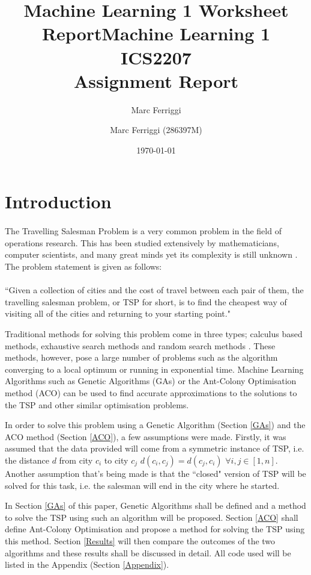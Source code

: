 \documentclass[11pt,a4paper,final]{article}
\author{Marc Ferriggi}
\title{Machine Learning 1 Worksheet Report}
\begin{document}
	\title{Machine Learning 1 \\
	\large ICS2207 \\ Assignment Report}
	\author{Marc Ferriggi (286397M)}
	\date{\today}
	\maketitle
	\tableofcontents
	
	\pagebreak
	\section{Introduction}
	\label{Intro}
	\paragraph{} The Travelling Salesman Problem is a very common problem in the field of operations research. This has been studied extensively by mathematicians, computer scientists, and many great minds yet its complexity is still unknown \cite{TSP}. The problem statement is given as follows:\\
	\hspace{0pt}\\
	``Given a collection of cities and the cost of travel between each pair of them, the travelling salesman problem, or TSP for short, is to find the cheapest way of visiting all of the cities and returning to your starting point." \cite{TSP}\\
	\par Traditional methods for solving this problem come in three types; calculus based methods, exhaustive search methods and random search methods \cite{Goldberg}. These methods, however, pose a large number of problems such as the algorithm converging to a local optimum or running in exponential time. Machine Learning Algorithms such as Genetic Algorithms (GAs) or the Ant-Colony Optimisation method (ACO) can be used to find accurate approximations to the solutions to the TSP and other similar optimisation problems. \\
	\par In order to solve this problem using a Genetic Algorithm (Section \ref{GAs}) and the ACO method (Section \ref{ACO}), a few assumptions were made. Firstly, it was assumed that the data provided will come from a symmetric instance of TSP, i.e. the distance $d$ from city $c_i$ to city $c_j$ $d(c_i,c_j)=d(c_j,c_i)$ $\forall i,j\in [1,n]$. Another assumption that's being made is that the ``closed" version of TSP will be solved for this task, i.e. the salesman will end in the city where he started.\\
	\par In Section \ref{GAs} of this paper, Genetic Algorithms shall be defined and a method to solve the TSP using such an algorithm will be proposed. Section \ref{ACO} shall define Ant-Colony Optimisation and propose a method for solving the TSP using this method. Section \ref{Results} will then compare the outcomes of the two algorithms and these results shall be discussed in detail. All code used will be listed in the Appendix (Section \ref{Appendix}). 
\end{document}
